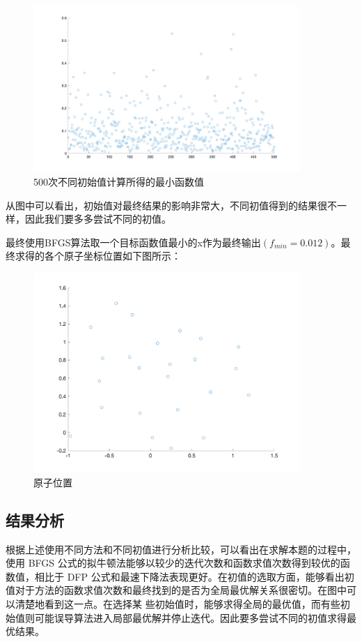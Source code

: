 \documentclass{article}
\begin{document}
\begin{figure}[H]
    \centering
    \includegraphics[width=0.9\textwidth]{pic1.png}
    \caption{500次不同初始值计算所得的最小函数值}
\end{figure}
从图中可以看出，初始值对最终结果的影响非常大，不同初值得到的结果很不一样，因此我们要多多尝试不同的初值。

最终使用BFGS算法取一个目标函数值最小的x作为最终输出$(f_{min}=0.012)$。最终求得的各个原子坐标位置如下图所示：

\begin{figure}[H]
    \centering
    \includegraphics[width=0.9\textwidth]{pic3.png}
    \caption{原子位置}
\end{figure}
\subsection{结果分析}
根据上述使用不同方法和不同初值进行分析比较，可以看出在求解本题的过程中，使用 BFGS 公式的拟牛顿法能够以较少的迭代次数和函数求值次数得到较优的函数值，相比于 DFP 公式和最速下降法表现更好。在初值的选取方面，能够看出初值对于方法的函数求值次数和最终找到的是否为全局最优解关系很密切。在图中可以清楚地看到这一点。在选择某 些初始值时，能够求得全局的最优值，而有些初始值则可能误导算法进入局部最优解并停止迭代。因此要多尝试不同的初值求得最优结果。
\end{document}
